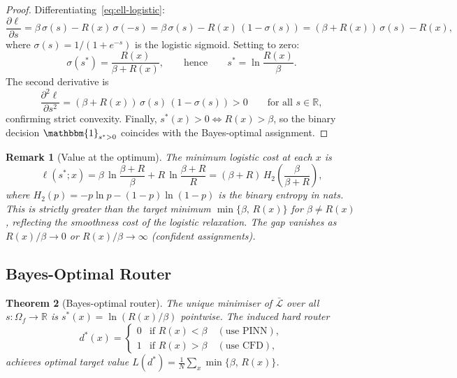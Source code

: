 \documentclass[11pt]{article}
\newtheorem{theorem}{Theorem}
\newtheorem{remark}[theorem]{Remark}
\newcommand{\R}{\mathbb{R}}
\newcommand{\Lcal}{\mathcal{L}}
\newcommand{\ind}{\mathbbm{1}}
\begin{document}
\begin{proof}
Differentiating~\eqref{eq:ell-logistic}:
\begin{equation}\label{eq:ell-deriv}
  \frac{\partial \ell}{\partial s}
  = \beta\,\sigma(s) - R(x)\,\sigma(-s)
  = \beta\,\sigma(s) - R(x)\,(1 - \sigma(s))
  = (\beta + R(x))\,\sigma(s) - R(x),
\end{equation}
where $\sigma(s) = 1/(1 + e^{-s})$ is the logistic sigmoid.  Setting to zero:
\begin{equation}
  \sigma(s^*) = \frac{R(x)}{\beta + R(x)},
  \qquad\text{hence}\qquad
  s^* = \ln\frac{R(x)}{\beta}.
\end{equation}
The second derivative is
\begin{equation}
  \frac{\partial^2 \ell}{\partial s^2}
  = (\beta + R(x))\,\sigma(s)\,(1 - \sigma(s)) > 0
  \qquad\text{for all } s \in \R,
\end{equation}
confirming strict convexity.  Finally,
$s^*(x) > 0 \iff R(x) > \beta$, so the binary decision
$\ind_{s^* > 0}$ coincides with the Bayes-optimal assignment.
\end{proof}

\begin{remark}[Value at the optimum]\label{rem:opt-value}
The minimum logistic cost at each $x$ is
\begin{equation}\label{eq:ell-star}
  \ell(s^*; x) = \beta\,\ln\!\frac{\beta + R}{\beta}
    + R\,\ln\!\frac{\beta + R}{R}
  = (\beta + R)\,H_2\!\!\left(\frac{\beta}{\beta + R}\right),
\end{equation}
where $H_2(p) = -p\ln p - (1-p)\ln(1-p)$ is the binary entropy in nats.  This is
strictly greater than the target minimum $\min\{\beta,\,R(x)\}$ for $\beta \ne R(x)$,
reflecting the smoothness cost of the logistic relaxation.  The gap vanishes as
$R(x)/\beta \to 0$ or $R(x)/\beta \to \infty$ (confident assignments).
\end{remark}

\subsection{Bayes-Optimal Router}

\begin{theorem}[Bayes-optimal router]\label{thm:bayes}
The unique minimiser of $\bar{\Lcal}$ over all $s \colon \Omega_f \to \R$ is
$s^*(x) = \ln(R(x)/\beta)$ pointwise.  The induced hard router
\begin{equation}\label{eq:bayes-router}
  d^*(x) =
  \begin{cases}
    0 & \text{if } R(x) < \beta \quad (\text{use PINN}), \\[3pt]
    1 & \text{if } R(x) > \beta \quad (\text{use CFD}),
  \end{cases}
\end{equation}
achieves optimal target value
$L(d^*) = \frac{1}{N}\sum_x \min\{\beta,\, R(x)\}$.
\end{theorem}
\end{document}
